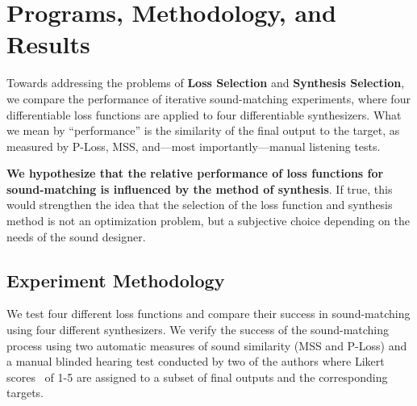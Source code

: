 \documentclass[lettersize,journal]{IEEEtran}
\newcommand{\LossSelect}{\textbf{Loss Selection}}
\newcommand{\SynthSelect}{\textbf{Synthesis Selection}}
\begin{document}
\section{Programs, Methodology, and Results}
\label{sec:progs_methodology_results}
Towards addressing the problems of \LossSelect{} and \SynthSelect{}, we compare the performance of iterative sound-matching experiments, where four differentiable loss functions are applied to four differentiable synthesizers. What we mean by ``performance'' is the similarity of the final output to the target, as measured by P-Loss, MSS, and---most importantly---manual listening tests.

\textbf{We hypothesize that the relative performance of loss functions for sound-matching is influenced by the method of synthesis}. If true, this would strengthen the idea that the selection of the loss function and synthesis method is not an optimization problem, but a subjective choice depending on the needs of the sound designer. 


\subsection{Experiment Methodology}
\label{sec:methodology}

We test four different loss functions and compare their success in sound-matching using four different synthesizers. We verify the success of the sound-matching process using two automatic measures of sound similarity (MSS and P-Loss) and a manual blinded hearing test conducted by two of the authors where Likert scores~\cite{jebb2021review} of 1-5 are assigned to a subset of final outputs and the corresponding targets.
\end{document}
